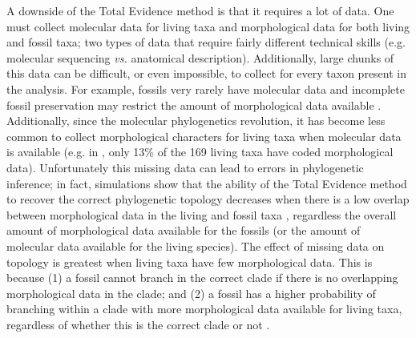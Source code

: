 \documentclass[12pt,letterpaper]{article}
\begin{document}
A downside of the Total Evidence method is that it requires a lot of data.
One must collect molecular data for living taxa and morphological data for both living and fossil taxa; two types of data that require fairly different technical skills (e.g. molecular sequencing \textit{vs.} anatomical description).
Additionally, large chunks of this data can be difficult, or even impossible, to collect for every taxon present in the analysis.
For example, fossils very rarely have molecular data and incomplete fossil preservation may restrict the amount of morphological data available \citep{sansomfossilization2013}. %
Additionally, since the molecular phylogenetics revolution, it has become less common to collect morphological characters for living taxa when molecular data is available (e.g. in \cite{slaterphylogenetic2013}, only 13\% of the 169 living taxa have coded morphological data).
Unfortunately this missing data can lead to errors in phylogenetic inference; in fact, simulations show that the ability of the Total Evidence method to recover the correct phylogenetic topology decreases when there is a low overlap between morphological data in the living and fossil taxa \citep{GuillermeCooper}, regardless the overall amount of morphological data available for the fossils (or the amount of molecular data available for the living species).
The effect of missing data on topology is greatest when living taxa have few morphological data.
This is because (1) a fossil cannot branch in the correct clade if there is no overlapping morphological data in the clade; and (2) a fossil has a higher probability of branching within a clade with more morphological data available for living taxa, regardless of whether this is the correct clade or not \citep{GuillermeCooper}. 
\end{document}
